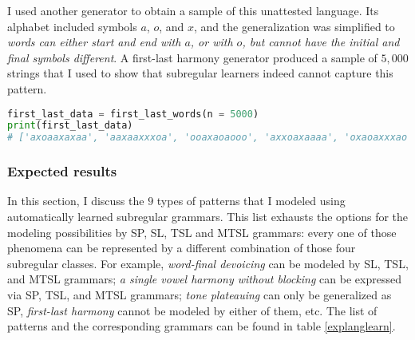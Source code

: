 I used another generator to obtain a sample of this unattested language.
Its alphabet included symbols $a$, $o$, and $x$, and the generalization was simplified to \emph{words can either start and end with $a$, or with $o$, but cannot have the initial and final symbols different}.
A first-last harmony generator produced a sample of $5,000$ strings that I used to show that subregular learners indeed cannot capture this pattern.


\begin{lstlisting}[language=Python]
first_last_data = first_last_words(n = 5000)
print(first_last_data)
# ['axoaaxaxaa', 'aaxaaxxxoa', 'ooaxaoaooo', 'axxoaxaaaa', 'oxaoaxxxao', ...]
\end{lstlisting}

\subsubsection{Expected results}

In this section, I discuss the $9$ types of patterns that I modeled using automatically learned subregular grammars.
This list exhausts the options for the modeling possibilities by SP, SL, TSL and MTSL grammars: every one of those phenomena can be represented by a different combination of those four subregular classes.
For example, \emph{word-final devoicing} can be modeled by SL, TSL, and MTSL grammars; \emph{a single vowel harmony without blocking} can be expressed via SP, TSL, and MTSL grammars; \emph{tone plateauing} can only be generalized as SP, \emph{first-last harmony} cannot be modeled by either of them, etc.
The list of patterns and the corresponding grammars can be found in table \ref{explanglearn}.


